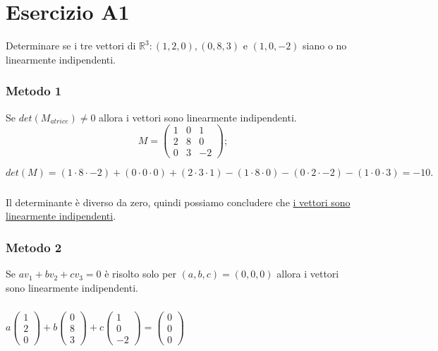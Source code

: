 \documentclass[a4paper]{report}
\newenvironment{problem}
        {
                \begin{mdframed}[topline=false,rightline=false,bottomline=false]
                        \slshape
        }
        {
                \end{mdframed}
        }
\begin{document}
        \chapter*{Esercizio A1}
        \begin{problem}
                Determinare se i tre vettori di $\mathbb{R}^3: (1,2,0), (0,8,3) \mbox{ e } (1,0,-2)$
                siano o no linearmente indipendenti.
        \end{problem}

        \subsection*{Metodo 1}
        Se $det(M_{atrice}) \neq 0$ allora i vettori sono linearmente indipendenti.
        \[
                M =
                \begin{pmatrix}
                        1 & 0 & 1 \\
                        2 & 8 & 0 \\
                        0 & 3 & -2
                \end{pmatrix};
        \]

        $
                det(M) = (1 \cdot 8 \cdot -2) + (0 \cdot 0 \cdot 0) + (2 \cdot 3 \cdot 1) - (1 \cdot 8 \cdot 0) - (0 \cdot 2 \cdot -2) - (1 \cdot 0 \cdot 3) = -10.
        $

        \paragraph{}
        Il determinante \`{e} diverso da zero, quindi possiamo concludere che \ul{i vettori sono linearmente indipendenti}.

        \subsection*{Metodo 2}
        Se
        $
                a v_1 + b v_2 + c v_3 = 0
        $
        \`{e} risolto solo per $(a, b, c) = (0, 0, 0)$ allora i vettori sono linearmente indipendenti.

        \paragraph{}
        $
                a \begin{pmatrix} 1 \\ 2 \\ 0 \end{pmatrix} + b \begin{pmatrix} 0 \\ 8 \\ 3 \end{pmatrix} + c \begin{pmatrix} 1 \\ 0 \\ -2 \end{pmatrix} = \begin{pmatrix} 0 \\ 0 \\ 0 \end{pmatrix}
        $
\end{document}
